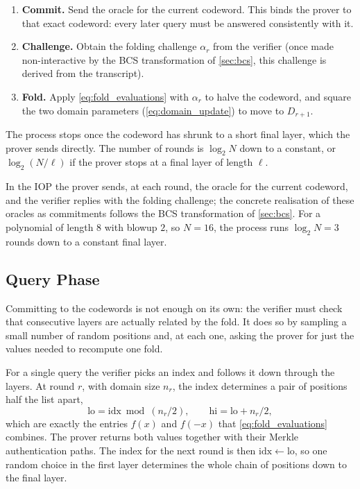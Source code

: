 \begin{enumerate}
  \item \textbf{Commit.} Send the oracle for the current codeword. This
    binds the prover to that exact codeword: every later query must be
    answered consistently with it.
  \item \textbf{Challenge.} Obtain the folding challenge $\alpha_r$ from
    the verifier (once made non-interactive by the BCS transformation of
    \cref{sec:bcs}, this challenge is derived from the transcript).
  \item \textbf{Fold.} Apply \cref{eq:fold_evaluations} with $\alpha_r$
    to halve the codeword, and square the two domain parameters
    (\cref{eq:domain_update}) to move to $D_{r+1}$.
\end{enumerate}

The process stops once the codeword has shrunk to a short final layer,
which the prover sends directly. The number of rounds is
$\log_2 N$ down to a constant, or $\log_2(N/\ell)$ if the prover stops
at a final layer of length $\ell$.

In the IOP the prover sends, at each round, the oracle for the current
codeword, and the verifier replies with the folding challenge; the
concrete realisation of these oracles as commitments follows the BCS
transformation of \cref{sec:bcs}. For a polynomial of length $8$ with
blowup $2$, so $N = 16$, the process runs $\log_2 N = 3$ rounds down to
a constant final layer.


\subsection{Query Phase}
\label{subsec:query_phase}

Committing to the codewords is not enough on its own: the verifier must
check that consecutive layers are actually related by the fold. It does
so by sampling a small number of random positions and, at each one,
asking the prover for just the values needed to recompute one fold.

For a single query the verifier picks an index and follows it down
through the layers. At round $r$, with domain size $n_r$, the index
determines a pair of positions half the list apart,
%
\[
\mathrm{lo} = \mathrm{idx} \bmod (n_r/2),
\qquad
\mathrm{hi} = \mathrm{lo} + n_r/2 ,
\]
%
which are exactly the entries $f(x)$ and $f(-x)$ that
\cref{eq:fold_evaluations} combines. The prover returns both values
together with their Merkle authentication paths. The index for the next
round is then $\mathrm{idx} \leftarrow \mathrm{lo}$, so one random choice
in the first layer determines the whole chain of positions down to the
final layer.

